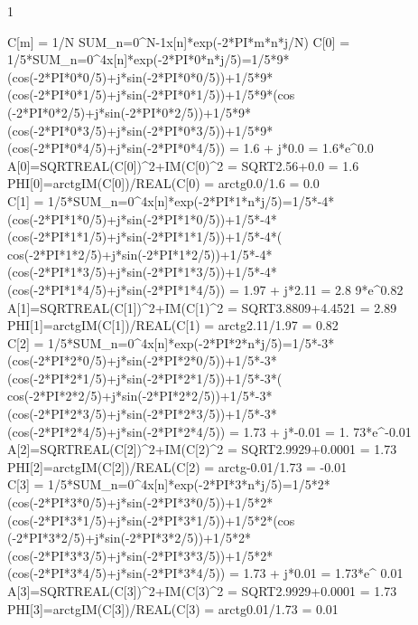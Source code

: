 \documentclass[14pt,a4paper]{scrartcl}
\begin{document}
\pagestyle{plain}
\pagecolor{white}


\begin{center}
\begin{Large}
1
\end{Large}
\end{center}
C[m] = 1/N SUM_{n=0}^{N-1}{x[n]*exp(-2*PI*m*n*j/N)}
C[0] = 1/5*SUM_{n=0}^{4}{x[n]*exp(-2*PI*0*n*j/5)}=1/5*9*(cos(-2*PI*0*0/5)+j*sin(-2*PI*0*0/5))+1/5*9*(cos(-2*PI*0*1/5)+j*sin(-2*PI*0*1/5))+1/5*9*(cos
(-2*PI*0*2/5)+j*sin(-2*PI*0*2/5))+1/5*9*(cos(-2*PI*0*3/5)+j*sin(-2*PI*0*3/5))+1/5*9*(cos(-2*PI*0*4/5)+j*sin(-2*PI*0*4/5)) = 1.6 + j*0.0 = 1.6*e^{0.0}\\
A[0]=SQRT{REAL(C[0])^2+IM(C[0)^2} = SQRT{2.56+0.0} = 1.6\\
PHI[0]=arctg{IM(C[0])/REAL(C[0)} = arctg{0.0/1.6} = 0.0\\

C[1] = 1/5*SUM_{n=0}^{4}{x[n]*exp(-2*PI*1*n*j/5)}=1/5*-4*(cos(-2*PI*1*0/5)+j*sin(-2*PI*1*0/5))+1/5*-4*(cos(-2*PI*1*1/5)+j*sin(-2*PI*1*1/5))+1/5*-4*(
cos(-2*PI*1*2/5)+j*sin(-2*PI*1*2/5))+1/5*-4*(cos(-2*PI*1*3/5)+j*sin(-2*PI*1*3/5))+1/5*-4*(cos(-2*PI*1*4/5)+j*sin(-2*PI*1*4/5)) = 1.97 + j*2.11 = 2.8
9*e^{0.82}\\
A[1]=SQRT{REAL(C[1])^2+IM(C[1)^2} = SQRT{3.8809+4.4521} = 2.89\\

PHI[1]=arctg{IM(C[1])/REAL(C[1)} = arctg{2.11/1.97} = 0.82\\

C[2] = 1/5*SUM_{n=0}^{4}{x[n]*exp(-2*PI*2*n*j/5)}=1/5*-3*(cos(-2*PI*2*0/5)+j*sin(-2*PI*2*0/5))+1/5*-3*(cos(-2*PI*2*1/5)+j*sin(-2*PI*2*1/5))+1/5*-3*(
cos(-2*PI*2*2/5)+j*sin(-2*PI*2*2/5))+1/5*-3*(cos(-2*PI*2*3/5)+j*sin(-2*PI*2*3/5))+1/5*-3*(cos(-2*PI*2*4/5)+j*sin(-2*PI*2*4/5)) = 1.73 + j*-0.01 = 1.
73*e^{-0.01}\\
A[2]=SQRT{REAL(C[2])^2+IM(C[2)^2} = SQRT{2.9929+0.0001} = 1.73\\
PHI[2]=arctg{IM(C[2])/REAL(C[2)} = arctg{-0.01/1.73} = -0.01\\

C[3] = 1/5*SUM_{n=0}^{4}{x[n]*exp(-2*PI*3*n*j/5)}=1/5*2*(cos(-2*PI*3*0/5)+j*sin(-2*PI*3*0/5))+1/5*2*(cos(-2*PI*3*1/5)+j*sin(-2*PI*3*1/5))+1/5*2*(cos
(-2*PI*3*2/5)+j*sin(-2*PI*3*2/5))+1/5*2*(cos(-2*PI*3*3/5)+j*sin(-2*PI*3*3/5))+1/5*2*(cos(-2*PI*3*4/5)+j*sin(-2*PI*3*4/5)) = 1.73 + j*0.01 = 1.73*e^{
0.01}\\
A[3]=SQRT{REAL(C[3])^2+IM(C[3)^2} = SQRT{2.9929+0.0001} = 1.73\\
PHI[3]=arctg{IM(C[3])/REAL(C[3)} = arctg{0.01/1.73} = 0.01\\
\end{document}
